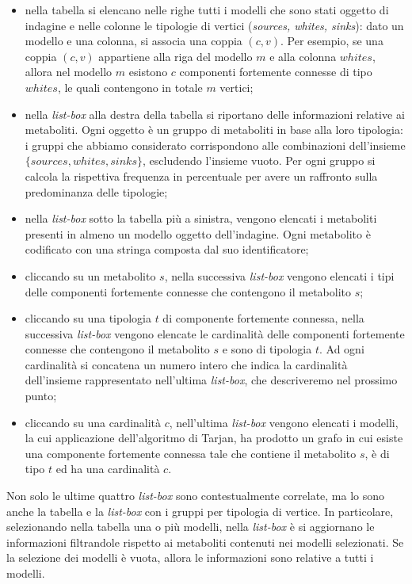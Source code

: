 \begin{itemize}
\item nella tabella si elencano nelle righe tutti i modelli che sono
  stati oggetto di indagine e nelle colonne le tipologie di vertici
  (\emph{sources, whites, sinks}): dato un modello e una colonna, si
  associa una coppia $(c, v)$. Per esempio, se una coppia $(c, v)$
  appartiene alla riga del modello $m$ e alla colonna $whites$, allora
  nel modello $m$ esistono $c$ componenti fortemente connesse di tipo
  $whites$, le quali contengono in totale $m$ vertici;
\item nella \emph{list-box} alla destra della tabella si riportano
  delle informazioni relative ai metaboliti. Ogni oggetto \`e un
  gruppo di metaboliti in base alla loro tipologia: i gruppi che
  abbiamo considerato corrispondono alle combinazioni dell'insieme
  $\{sources, whites, sinks\}$, escludendo l'insieme vuoto. Per ogni
  gruppo si calcola la rispettiva frequenza in percentuale per avere
  un raffronto sulla predominanza delle tipologie;
\item nella \emph{list-box} sotto la tabella pi\`u a sinistra, vengono
  elencati i metaboliti presenti in almeno un modello oggetto
  dell'indagine. Ogni metabolito \`e codificato con una stringa
  composta dal suo identificatore;
\item cliccando su un metabolito $s$, nella successiva \emph{list-box}
  vengono elencati i tipi delle componenti fortemente connesse che
  contengono il metabolito $s$;
\item cliccando su una tipologia $t$ di componente fortemente
  connessa, nella successiva \emph{list-box} vengono elencate le
  cardinalit\`a delle componenti fortemente connesse che contengono il
  metabolito $s$ e sono di tipologia $t$. Ad ogni cardinalit\`a si
  concatena un numero intero che indica la cardinalit\`a dell'insieme
  rappresentato nell'ultima \emph{list-box}, che descriveremo nel
  prossimo punto;
\item cliccando su una cardinalit\`a $c$, nell'ultima \emph{list-box}
  vengono elencati i modelli, la cui applicazione dell'algoritmo di
  Tarjan, ha prodotto un grafo in cui esiste una componente fortemente
  connessa tale che contiene il metabolito $s$, \`e di tipo $t$ ed ha
  una cardinalit\`a $c$.
\end{itemize}

Non solo le ultime quattro \emph{list-box} sono contestualmente
correlate, ma lo sono anche la tabella e la \emph{list-box} con i
gruppi per tipologia di vertice. In particolare, selezionando nella
tabella una o pi\`u modelli, nella \emph{list-box} \`e si aggiornano
le informazioni filtrandole rispetto ai metaboliti contenuti nei
modelli selezionati. Se la selezione dei modelli \`e vuota, allora le
informazioni sono relative a tutti i modelli. 

